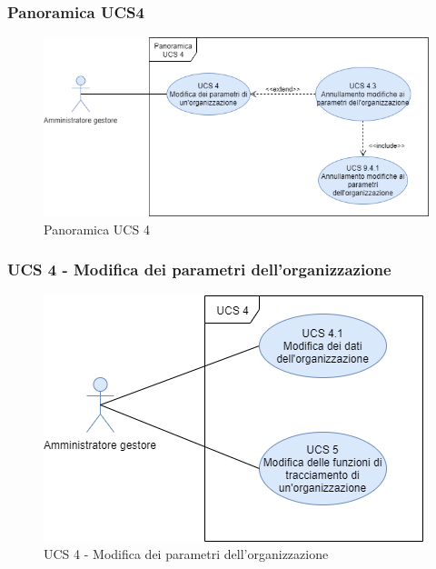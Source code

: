 \subsubsection{Panoramica UCS4}

\begin{figure}[h]
	\centering	
	\includegraphics[scale=0.53]{sezioni/UseCase/Immagini/PS4.png}
	\caption{Panoramica UCS 4}
\end{figure}

\subsubsection{UCS 4 - Modifica dei parametri dell'organizzazione}%

\begin{figure}[h]
	\centering	
	\includegraphics[scale=0.53]{sezioni/UseCase/Immagini/UCS4.png}
	\caption{UCS 4 - Modifica dei parametri dell'organizzazione}
\end{figure}

